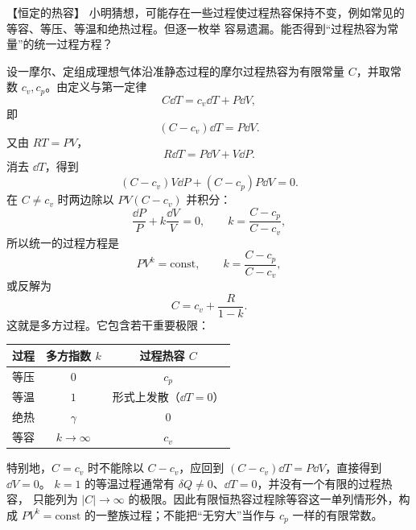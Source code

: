 {\begin{origexamplebox}{【恒定的热容】}\label{ch15:ex:s29-20-4}
小明猜想，可能存在一些过程使过程热容保持不变，例如常见的等容、等压、等温和绝热过程。但逐一枚举
容易遗漏。能否得到“过程热容为常量”的统一过程方程？

\ThQConstantCapacity
\end{origexamplebox}\par\nopagebreak[4]

\par\nopagebreak[4]\begin{xesolution}
\ThAConstantCapacity

设一摩尔、定组成理想气体沿准静态过程的摩尔过程热容为有限常量 $C$，并取常数 $c_v,c_p$。由定义与第一定律
\begin{equation*}
  C\dd T=c_v\dd T+P\dd V,
\end{equation*}
即
\begin{equation*}
  (C-c_v)\dd T=P\dd V.
\end{equation*}
又由 $RT=PV$，
\begin{equation*}
  R\dd T=P\dd V+V\dd P.
\end{equation*}
消去 $\dd T$，得到
\begin{equation*}
  (C-c_v)V\dd P+(C-c_p)P\dd V=0.
\end{equation*}
在 $C\ne c_v$ 时两边除以 $PV(C-c_v)$ 并积分：
\begin{equation*}
  \frac{\dd P}{P}+k\frac{\dd V}{V}=0,
  \qquad
  k=\frac{C-c_p}{C-c_v},
\end{equation*}
所以统一的过程方程是
\begin{equation}
  \boxed{PV^k=\mathrm{const}},
  \qquad
  \boxed{k=\frac{C-c_p}{C-c_v}},
\end{equation}
或反解为
\begin{equation}
  \boxed{C=c_v+\frac{R}{1-k}}.
\end{equation}
这就是多方过程。它包含若干重要极限：
\begin{center}
\small
\begin{tabular}{c c c}
\toprule
过程 & 多方指数 $k$ & 过程热容 $C$\\
\midrule
等压 & $0$ & $c_p$\\
等温 & $1$ & 形式上发散（$\dd T=0$）\\
绝热 & $\gamma$ & $0$\\
等容 & $k\to\infty$ & $c_v$\\
\bottomrule
\end{tabular}
\end{center}\nopagebreak[2]
特别地，$C=c_v$ 时不能除以 $C-c_v$，应回到 $(C-c_v)\dd T=P\dd V$，直接得到 $\dd V=0$。
$k=1$ 的等温过程通常有 $\delta Q\ne0$、$\dd T=0$，并没有一个有限的过程热容，
只能列为 $|C|\to\infty$ 的极限。因此有限恒热容过程除等容这一单列情形外，构成
$PV^k=\mathrm{const}$ 的一整族过程；不能把“无穷大”当作与 $c_p$ 一样的有限常数。
\end{xesolution}


}

